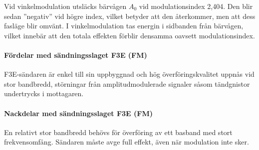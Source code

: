 Vid vinkelmodulation utsläcks bärvågen \(A_0\) vid modulationsindex 2,404.
Den blir sedan ''negativ'' vid högre index, vilket betyder att den återkommer,
men att dess fasläge blir omvänt.
I vinkelmodulation tas energin i sidbanden från bärvågen, vilket innebär att
den totala effekten förblir densamma oavsett modulationsindex.


\paragraph{Fördelar med sändningsslaget F3E (FM)}
F3E-sän\-daren är enkel till sin uppbyggnad och hög överföringskvalitet
uppnås vid stor bandbredd, störningar från amplitudmodulerade signaler såsom
tändgnistor undertrycks i mottagaren.

\paragraph{Nackdelar med sändningsslaget F3E (FM)}
En relativt stor bandbredd behövs för överföring av ett basband med stort
frekvensomfång.
Sändaren måste avge full effekt, även när modulation inte sker.

